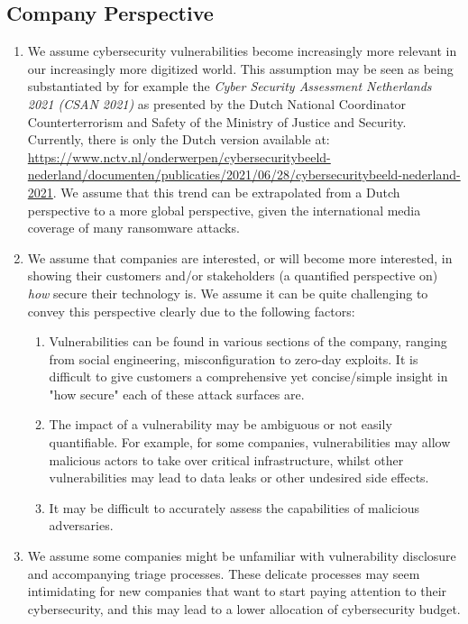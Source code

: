 \subsection{Company Perspective}
\begin{enumerate}
	\item We assume cybersecurity vulnerabilities become increasingly more relevant in our increasingly more digitized world. This assumption may be seen as being substantiated by for example the \textit{Cyber Security Assessment Netherlands 2021 (CSAN 2021)} as presented by the Dutch National Coordinator Counterterrorism and Safety of the Ministry of Justice and Security. Currently, there is only the Dutch version available at: \url{https://www.nctv.nl/onderwerpen/cybersecuritybeeld-nederland/documenten/publicaties/2021/06/28/cybersecuritybeeld-nederland-2021}. We assume that this trend can be extrapolated from a Dutch perspective to a more global perspective, given the international media coverage of many ransomware attacks.
	\item We assume that companies are interested, or will become more interested, in showing their customers and/or stakeholders (a quantified perspective on) \textit{how} secure their technology is. We assume it can be quite challenging to convey this perspective clearly due to the following factors:
	\begin{enumerate}
		\item Vulnerabilities can be found in various sections of the company, ranging from social engineering, misconfiguration to zero-day exploits. It is difficult to give customers a comprehensive yet concise/simple insight in "how secure" each of these attack surfaces are.
		\item The impact of a vulnerability may be ambiguous or not easily quantifiable. For example, for some companies, vulnerabilities may allow malicious actors to take over critical infrastructure, whilst other vulnerabilities may lead to data leaks or other undesired side effects.
		\item It may be difficult to accurately assess the capabilities of malicious adversaries.
	\end{enumerate}
	\item We assume some companies might be unfamiliar with vulnerability disclosure and accompanying triage processes. These delicate processes may seem intimidating for new companies that want to start paying attention to their cybersecurity, and this may lead to a lower allocation of cybersecurity budget.
\end{enumerate}